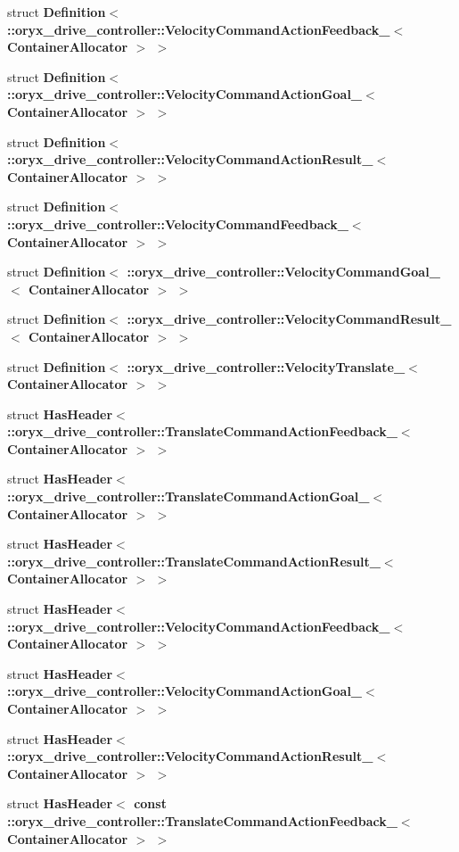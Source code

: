 \begin{DoxyCompactItemize}
struct {\bf \-Definition$<$ \-::oryx\-\_\-drive\-\_\-controller\-::\-Velocity\-Command\-Action\-Feedback\-\_\-$<$ Container\-Allocator $>$ $>$}
\item 
struct {\bf \-Definition$<$ \-::oryx\-\_\-drive\-\_\-controller\-::\-Velocity\-Command\-Action\-Goal\-\_\-$<$ Container\-Allocator $>$ $>$}
\item 
struct {\bf \-Definition$<$ \-::oryx\-\_\-drive\-\_\-controller\-::\-Velocity\-Command\-Action\-Result\-\_\-$<$ Container\-Allocator $>$ $>$}
\item 
struct {\bf \-Definition$<$ \-::oryx\-\_\-drive\-\_\-controller\-::\-Velocity\-Command\-Feedback\-\_\-$<$ Container\-Allocator $>$ $>$}
\item 
struct {\bf \-Definition$<$ \-::oryx\-\_\-drive\-\_\-controller\-::\-Velocity\-Command\-Goal\-\_\-$<$ Container\-Allocator $>$ $>$}
\item 
struct {\bf \-Definition$<$ \-::oryx\-\_\-drive\-\_\-controller\-::\-Velocity\-Command\-Result\-\_\-$<$ Container\-Allocator $>$ $>$}
\item 
struct {\bf \-Definition$<$ \-::oryx\-\_\-drive\-\_\-controller\-::\-Velocity\-Translate\-\_\-$<$ Container\-Allocator $>$ $>$}
\item 
struct {\bf \-Has\-Header$<$ \-::oryx\-\_\-drive\-\_\-controller\-::\-Translate\-Command\-Action\-Feedback\-\_\-$<$ Container\-Allocator $>$ $>$}
\item 
struct {\bf \-Has\-Header$<$ \-::oryx\-\_\-drive\-\_\-controller\-::\-Translate\-Command\-Action\-Goal\-\_\-$<$ Container\-Allocator $>$ $>$}
\item 
struct {\bf \-Has\-Header$<$ \-::oryx\-\_\-drive\-\_\-controller\-::\-Translate\-Command\-Action\-Result\-\_\-$<$ Container\-Allocator $>$ $>$}
\item 
struct {\bf \-Has\-Header$<$ \-::oryx\-\_\-drive\-\_\-controller\-::\-Velocity\-Command\-Action\-Feedback\-\_\-$<$ Container\-Allocator $>$ $>$}
\item 
struct {\bf \-Has\-Header$<$ \-::oryx\-\_\-drive\-\_\-controller\-::\-Velocity\-Command\-Action\-Goal\-\_\-$<$ Container\-Allocator $>$ $>$}
\item 
struct {\bf \-Has\-Header$<$ \-::oryx\-\_\-drive\-\_\-controller\-::\-Velocity\-Command\-Action\-Result\-\_\-$<$ Container\-Allocator $>$ $>$}
\item 
struct {\bf \-Has\-Header$<$ const \-::oryx\-\_\-drive\-\_\-controller\-::\-Translate\-Command\-Action\-Feedback\-\_\-$<$ Container\-Allocator $>$ $>$}
\item 

\end{DoxyCompactItemize}
